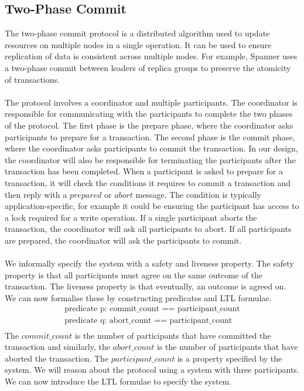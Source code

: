 \subsection{Two-Phase Commit} \label{sec:2pc}
The two-phase commit protocol is a distributed algorithm used to update resources on multiple nodes in a single operation. It can be used to ensure replication of data is consistent across multiple nodes. For example, Spanner \cite{spanner} uses a two-phase commit between leaders of replica groups to preserve the atomicity of transactions.
\\ \\
The protocol involves a coordinator and multiple participants. The coordinator is responsible for communicating with the participants to complete the two phases of the protocol. The first phase is the prepare phase, where the coordinator asks participants to prepare for a transaction. The second phase is the commit phase, where the coordinator asks participants to commit the transaction. In our design, the coordinator will also be responsible for terminating the participants after the transaction has been completed. When a participant is asked to prepare for a transaction, it will check the conditions it requires to commit a transaction and then reply with a $prepared$ or $abort$ message. The condition is typically application-specific, for example it could be ensuring the participant has access to a lock required for a write operation. If a single participant aborts the transaction, the coordinator will ask all participants to abort. If all participants are prepared, the coordinator will ask the participants to commit.
\\ \\
We informally specify the system with a safety and liveness property. The safety property is that all participants must agree on the same outcome of the transaction. The liveness property is that eventually, an outcome is agreed on. We can now formalise these by constructing predicates and LTL formulae.
\[
\begin{array}{l}
\text{predicate p: commit\_count == participant\_count} \\
\text{predicate q: abort\_count == participant\_count} \\
\end{array}
\]
The $commit\_count$ is the number of participants that have committed the transaction and similarly, the $abort\_count$ is the number of participants that have aborted the transaction. The $participant\_count$ is a property specified by the system. We will reason about the protocol using a system with three participants. We can now introduce the LTL formulae to specify the system.
